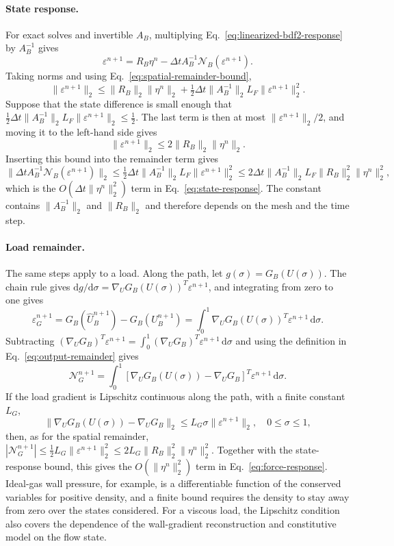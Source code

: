 \documentclass[a4paper,fleqn]{cas-sc}
\newcommand{\dd}{\,\mathrm{d}}
\newcommand{\eps}{\varepsilon}
\begin{document}
\paragraph{State response.}
For exact solves and invertible $A_B$, multiplying Eq.~\eqref{eq:linearized-bdf2-response} by $A_B^{-1}$ gives
\[
 \eps^{n+1}=R_B\eta^n-\Delta t A_B^{-1}\mathcal N_B(\eps^{n+1}).
\]
Taking norms and using Eq.~\eqref{eq:spatial-remainder-bound},
\[
 \|\eps^{n+1}\|_2
 \leq\|R_B\|_2\|\eta^n\|_2
 +\tfrac12\Delta t\|A_B^{-1}\|_2L_F\|\eps^{n+1}\|_2^2.
\]
Suppose that the state difference is small enough that $\tfrac12\Delta t\|A_B^{-1}\|_2L_F\|\eps^{n+1}\|_2\leq\tfrac12$. The last term is then at most $\|\eps^{n+1}\|_2/2$, and moving it to the left-hand side gives
\[
 \|\eps^{n+1}\|_2\leq2\|R_B\|_2\|\eta^n\|_2.
\]
Inserting this bound into the remainder term gives
\[
 \|\Delta t A_B^{-1}\mathcal N_B(\eps^{n+1})\|_2
 \leq\tfrac12\Delta t\|A_B^{-1}\|_2L_F\|\eps^{n+1}\|_2^2
 \leq2\Delta t\|A_B^{-1}\|_2L_F\|R_B\|_2^2\|\eta^n\|_2^2,
\]
which is the $O(\Delta t\|\eta^n\|_2^2)$ term in Eq.~\eqref{eq:state-response}. The constant contains $\|A_B^{-1}\|_2$ and $\|R_B\|_2$ and therefore depends on the mesh and the time step.

\paragraph{Load remainder.}
The same steps apply to a load. Along the path, let $g(\sigma)=G_B(U(\sigma))$. The chain rule gives $\mathrm dg/\mathrm d\sigma=\nabla_U G_B(U(\sigma))^T\eps^{n+1}$, and integrating from zero to one gives
\[
 \eps_G^{n+1}=G_B(\widehat U_B^{n+1})-G_B(U_B^{n+1})
 =\int_0^1\nabla_U G_B(U(\sigma))^T\eps^{n+1}\dd\sigma.
\]
Subtracting $(\nabla_U G_B)^T\eps^{n+1}=\int_0^1(\nabla_U G_B)^T\eps^{n+1}\dd\sigma$ and using the definition in Eq.~\eqref{eq:output-remainder} gives
\[
 \mathcal N_G^{n+1}=\int_0^1
 [\nabla_U G_B(U(\sigma))-\nabla_U G_B]^T\eps^{n+1}\dd\sigma.
\]
If the load gradient is Lipschitz continuous along the path, with a finite constant $L_G$,
\begin{equation}
 \|\nabla_U G_B(U(\sigma))-\nabla_U G_B\|_2
 \leq L_G\sigma\|\eps^{n+1}\|_2,
 \quad 0\leq\sigma\leq1,
 \label{eq:output-gradient-variation-bound}
\end{equation}
then, as for the spatial remainder, $|\mathcal N_G^{n+1}|\leq\tfrac12L_G\|\eps^{n+1}\|_2^2\leq2L_G\|R_B\|_2^2\|\eta^n\|_2^2$. Together with the state-response bound, this gives the $O(\|\eta^n\|_2^2)$ term in Eq.~\eqref{eq:force-response}. Ideal-gas wall pressure, for example, is a differentiable function of the conserved variables for positive density, and a finite bound requires the density to stay away from zero over the states considered. For a viscous load, the Lipschitz condition also covers the dependence of the wall-gradient reconstruction and constitutive model on the flow state.
\end{document}

